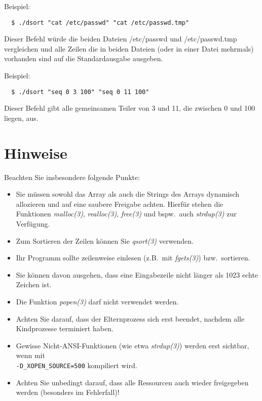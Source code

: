 Beispiel:
\begin{verbatim}
  $ ./dsort "cat /etc/passwd" "cat /etc/passwd.tmp"
\end{verbatim}

Dieser Befehl würde die beiden Dateien /etc/passwd und /etc/passwd.tmp
vergleichen und alle Zeilen die in beiden Dateien (oder in einer Datei
mehrmals) vorhanden sind auf die Standardausgabe ausgeben.

Beispiel:
\begin{verbatim}
  $ ./dsort "seq 0 3 100" "seq 0 11 100"
\end{verbatim}

Dieser Befehl gibt alle gemeinsamen Teiler von 3 und 11, die zwischen
0 und 100 liegen, aus.

\section*{Hinweise}

Beachten Sie insbesondere folgende Punkte:

\begin{itemize}
\item Sie müssen sowohl das Array als auch die Strings des Arrays
dynamisch allozieren und auf eine saubere Freigabe achten. Hierfür
stehen die Funktionen \emph{malloc(3)}, \emph{realloc(3)},
\emph{free(3)} und bspw.\ auch \emph{strdup(3)} zur Verfügung.
\item Zum Sortieren der Zeilen können Sie \emph{qsort(3)} verwenden.
\item Ihr Programm sollte zeilenweise einlesen (z.B.\ mit
\emph{fgets(3)}) bzw.\ sortieren.
\item Sie können davon ausgehen, dass eine Eingabezeile nicht länger
als 1023 echte Zeichen ist.
\item Die Funktion \emph{popen(3)} darf nicht verwendet werden.
\item Achten Sie darauf, dass der Elternprozess sich erst beendet,
nachdem alle Kindprozesse terminiert haben.
\item Gewisse Nicht-ANSI-Funktionen (wie etwa \emph{strdup(3)}) werden
erst sichtbar, wenn mit\\
\verb,-D_XOPEN_SOURCE=500, kompiliert wird.
\item Achten Sie unbedingt darauf, dass alle Ressourcen auch wieder
freigegeben werden (besonders im Fehlerfall)!
\end{itemize}

\osueguidelinestwo


